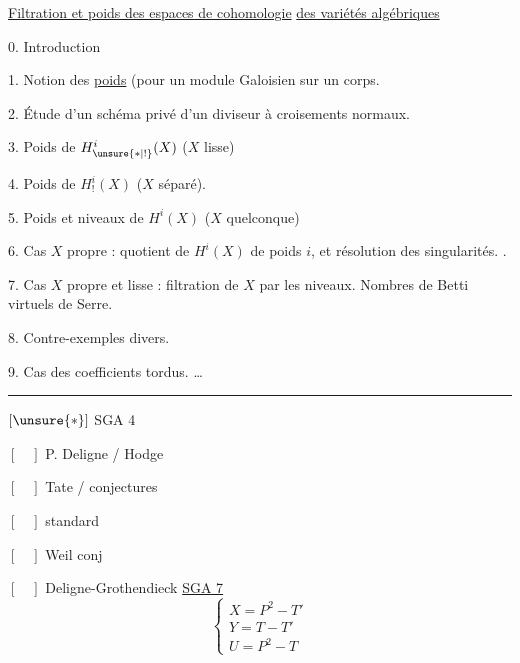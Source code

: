 
\uline{Filtration et poids  des espaces de cohomologie}
\uline{des variétés algébriques}

0. Introduction

1. Notion des \uline{poids}  (pour un  module  Galoisien sur un corps.

2. Étude d'un schéma privé d'un diviseur à croisements normaux.

3. Poids  de $H^i_{\unsure{*|!}}(X)$ ($X$ lisse)

4. Poids  de $H^i_!(X)$ ($X$ séparé). 

5. Poids et niveaux de $H^i(X)$ ($X$ quelconque)

6. Cas $X$ propre :  quotient de $H^i(X)$ de poids $i$, et résolution des singularités. .

7. Cas $X$ propre et lisse : filtration de $X$ par les niveaux.
Nombres de Betti virtuels de Serre.

8. Contre-exemples divers.

9. Cas des coefficients tordus. \ldots

\hrule

$[\unsure{*}]$ SGA 4

$[\quad]$ P. Deligne / Hodge

$[\quad]$ Tate / conjectures

$[\quad]$   standard

$[\quad]$ Weil conj

$[\quad]$ Deligne-Grothendieck \uline{SGA 7}
\[
\left\{\begin{array}{l}
X=P^2-T'\\
Y=T-T'\\
U=P^2-T
\end{array}\right.
\]

